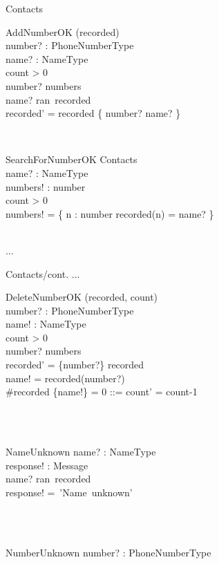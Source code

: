 \documentclass[12pt]{article}
\begin{document}
\begin{spacing}{1.5}
\begin{class}{Contacts}
\begin{op}{AddNumberOK}
\Delta (recorded) \\
number? : PhoneNumberType\\
name? : NameType\\
\ST
count > 0 \\
number? \notin numbers\\
name? \in ran~recorded\\
recorded' = recorded \cup \{ number? \mapsto name? \} \\
\end{op}\\
\begin{op}{SearchForNumberOK}
\Xi Contacts\\
name? : NameType\\
numbers! : \pset number\\
\ST
count > 0 \\
numbers! = \{ n : number \cbar recorded(n) = name? \}
\end{op}\\
...
\end{class}
\newpage
\begin{class}{Contacts/cont.}
...
\also
\begin{op}{DeleteNumberOK}
\Delta (recorded, count) \\
number? : PhoneNumberType\\
name! : NameType\\
\ST
count > 0 \\
number? \in numbers\\
recorded' = \{number?\} \ndres recorded \\
name! = recorded(number?)\\
\#recorded \rres \{name!\} = 0 ::= count' = count-1
\end{op}\\
\\
\begin{op}{NameUnknown}
name? : NameType\\
response! : Message\\
\ST
name? \notin ran~recorded\\
response! =~'Name~unknown'
\end{op}\\
\\
\begin{op}{NumberUnknown}
number? : PhoneNumberType\\

\end{op}
\end{class}
\end{spacing}
\end{document}
